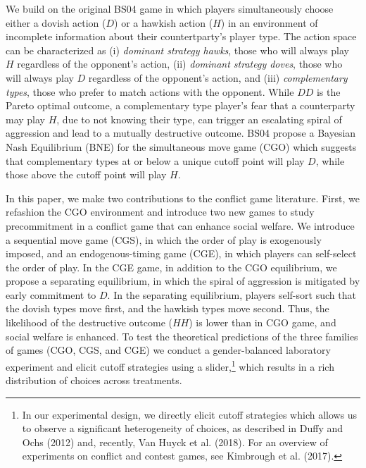 \documentclass[12pt, letterpaper]{article}
\theoremstyle{plain}
\begin{document}
We build on the original BS04 game in which players simultaneously choose either a dovish action ($D$) or a hawkish action ($H$) in an environment of incomplete information about their countertparty's player type. The action space can be characterized as (i) \textit{dominant strategy hawks}, those who will always play $H$ regardless of the opponent's action, (ii) \textit{dominant strategy doves}, those who will always play $D$ regardless of the opponent's action, and (iii) \textit{complementary types}, those who prefer to match actions with the opponent. While $DD$ is the Pareto optimal outcome, a complementary type player's fear that a counterparty may play $H$, due to not knowing their type, can trigger an escalating spiral of aggression and lead to a mutually destructive outcome. BS04 propose a Bayesian Nash Equilibrium (BNE) for the simultaneous move game (CGO) which suggests that complementary types at or below a unique cutoff point will play $D$, while those above the cutoff point will play $H$.

In this paper, we make two contributions to the conflict game literature. First, we refashion the CGO environment and introduce two new games to study precommitment in a conflict game that can enhance social welfare. We introduce a sequential move game (CGS), in which the order of play is exogenously imposed, and an endogenous-timing game (CGE), in which players can self-select the order of play. In the CGE game, in addition to the CGO equilibrium, we propose a separating equilibrium, in which the spiral of aggression is mitigated by early commitment to $D$. In the separating equilibrium, players self-sort such that the dovish types move first, and the hawkish types move second. Thus, the likelihood of the destructive outcome ($HH$) is lower than in CGO game, and social welfare is enhanced. To test the theoretical predictions of the three families of games (CGO, CGS, and CGE) we conduct a gender-balanced laboratory experiment and elicit cutoff strategies using a slider,\footnote{In our experimental design, we directly elicit cutoff strategies which allows us to observe a significant heterogeneity of choices, as described in Duffy and Ochs (2012) and, recently, Van Huyck et al. (2018).  For an overview of experiments on conflict and contest games, see Kimbrough et al. (2017). } which results in a rich distribution of choices across treatments. 
\end{document}
